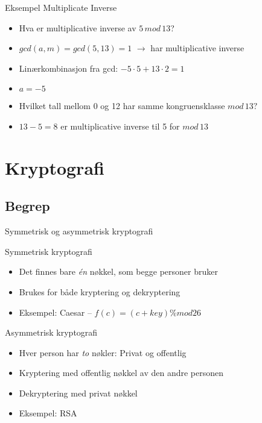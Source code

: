 \begin{frame}{Eksempel Multiplicate Inverse}
\begin{itemize}
\item Hva er multiplicative inverse av $5\, mod\, 13$?
\item $gcd(a,m) = gcd(5,13)=1$ $\rightarrow$ har multiplicative inverse
\item Linærkombinasjon fra gcd: $-5\cdot 5+13\cdot 2=1$
\item $a = -5$
\item Hvilket tall mellom 0 og 12 har samme kongruensklasse $mod\, 13?$ 
\item $13-5=8$ er multiplicative inverse til 5 for $mod\, 13$
\end{itemize}
\end{frame}


\section{Kryptografi}
\subsection*{Begrep}
\begin{frame}{Symmetrisk og asymmetrisk kryptografi}
\begin{block}{Symmetrisk kryptografi}
\begin{itemize}
\item Det finnes bare \textit{én} nøkkel, som begge personer bruker
\item Brukes for både kryptering og dekryptering
\item Eksempel: Caesar – $f(c) = (c+key) \% mod 26$
\end{itemize}
\end{block}
\begin{block}{Asymmetrisk kryptografi}
\begin{itemize}
\item Hver person har \textit{to} nøkler: Privat og offentlig
\item Kryptering med offentlig nøkkel av den andre personen
\item Dekryptering med privat nøkkel
\item Eksempel: RSA
\end{itemize}
\end{block}
\end{frame}

